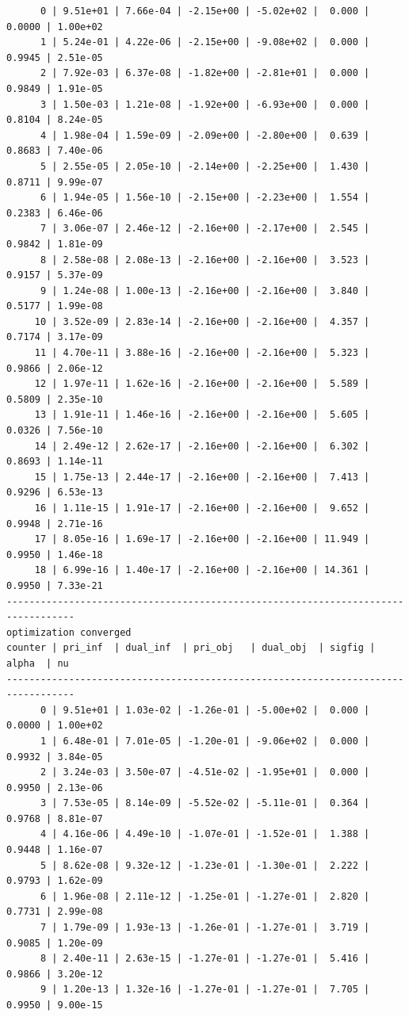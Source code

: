 \documentclass[
]{book}
\begin{document}
\begin{verbatim}
      0 | 9.51e+01 | 7.66e-04 | -2.15e+00 | -5.02e+02 |  0.000 | 0.0000 | 1.00e+02
      1 | 5.24e-01 | 4.22e-06 | -2.15e+00 | -9.08e+02 |  0.000 | 0.9945 | 2.51e-05
      2 | 7.92e-03 | 6.37e-08 | -1.82e+00 | -2.81e+01 |  0.000 | 0.9849 | 1.91e-05
      3 | 1.50e-03 | 1.21e-08 | -1.92e+00 | -6.93e+00 |  0.000 | 0.8104 | 8.24e-05
      4 | 1.98e-04 | 1.59e-09 | -2.09e+00 | -2.80e+00 |  0.639 | 0.8683 | 7.40e-06
      5 | 2.55e-05 | 2.05e-10 | -2.14e+00 | -2.25e+00 |  1.430 | 0.8711 | 9.99e-07
      6 | 1.94e-05 | 1.56e-10 | -2.15e+00 | -2.23e+00 |  1.554 | 0.2383 | 6.46e-06
      7 | 3.06e-07 | 2.46e-12 | -2.16e+00 | -2.17e+00 |  2.545 | 0.9842 | 1.81e-09
      8 | 2.58e-08 | 2.08e-13 | -2.16e+00 | -2.16e+00 |  3.523 | 0.9157 | 5.37e-09
      9 | 1.24e-08 | 1.00e-13 | -2.16e+00 | -2.16e+00 |  3.840 | 0.5177 | 1.99e-08
     10 | 3.52e-09 | 2.83e-14 | -2.16e+00 | -2.16e+00 |  4.357 | 0.7174 | 3.17e-09
     11 | 4.70e-11 | 3.88e-16 | -2.16e+00 | -2.16e+00 |  5.323 | 0.9866 | 2.06e-12
     12 | 1.97e-11 | 1.62e-16 | -2.16e+00 | -2.16e+00 |  5.589 | 0.5809 | 2.35e-10
     13 | 1.91e-11 | 1.46e-16 | -2.16e+00 | -2.16e+00 |  5.605 | 0.0326 | 7.56e-10
     14 | 2.49e-12 | 2.62e-17 | -2.16e+00 | -2.16e+00 |  6.302 | 0.8693 | 1.14e-11
     15 | 1.75e-13 | 2.44e-17 | -2.16e+00 | -2.16e+00 |  7.413 | 0.9296 | 6.53e-13
     16 | 1.11e-15 | 1.91e-17 | -2.16e+00 | -2.16e+00 |  9.652 | 0.9948 | 2.71e-16
     17 | 8.05e-16 | 1.69e-17 | -2.16e+00 | -2.16e+00 | 11.949 | 0.9950 | 1.46e-18
     18 | 6.99e-16 | 1.40e-17 | -2.16e+00 | -2.16e+00 | 14.361 | 0.9950 | 7.33e-21
----------------------------------------------------------------------------------
optimization converged
counter | pri_inf  | dual_inf  | pri_obj   | dual_obj  | sigfig | alpha  | nu 
----------------------------------------------------------------------------------
      0 | 9.51e+01 | 1.03e-02 | -1.26e-01 | -5.00e+02 |  0.000 | 0.0000 | 1.00e+02
      1 | 6.48e-01 | 7.01e-05 | -1.20e-01 | -9.06e+02 |  0.000 | 0.9932 | 3.84e-05
      2 | 3.24e-03 | 3.50e-07 | -4.51e-02 | -1.95e+01 |  0.000 | 0.9950 | 2.13e-06
      3 | 7.53e-05 | 8.14e-09 | -5.52e-02 | -5.11e-01 |  0.364 | 0.9768 | 8.81e-07
      4 | 4.16e-06 | 4.49e-10 | -1.07e-01 | -1.52e-01 |  1.388 | 0.9448 | 1.16e-07
      5 | 8.62e-08 | 9.32e-12 | -1.23e-01 | -1.30e-01 |  2.222 | 0.9793 | 1.62e-09
      6 | 1.96e-08 | 2.11e-12 | -1.25e-01 | -1.27e-01 |  2.820 | 0.7731 | 2.99e-08
      7 | 1.79e-09 | 1.93e-13 | -1.26e-01 | -1.27e-01 |  3.719 | 0.9085 | 1.20e-09
      8 | 2.40e-11 | 2.63e-15 | -1.27e-01 | -1.27e-01 |  5.416 | 0.9866 | 3.20e-12
      9 | 1.20e-13 | 1.32e-16 | -1.27e-01 | -1.27e-01 |  7.705 | 0.9950 | 9.00e-15

\end{verbatim}
\end{document}
